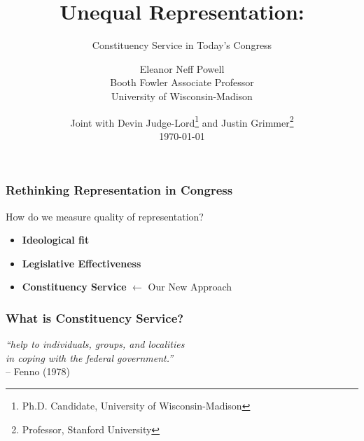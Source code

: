 \documentclass[13pt]{beamer}
\title{Unequal Representation:}
\subtitle{Constituency Service in Today's Congress}
\author[Judge-Lord, Grimmer, Powell]{Eleanor Neff Powell \\ Booth Fowler Associate Professor \\ University of Wisconsin-Madison}
\date[\today]{Joint with Devin Judge-Lord\thanks{Ph.D. Candidate, University of Wisconsin-Madison} and Justin Grimmer\thanks{Professor, Stanford University} \\ \bigskip \today}
\begin{document}
\begin{frame}
\maketitle
\end{frame}






\begin{frame} 
\frametitle{Rethinking Representation in Congress}
\Large
How do we measure quality of representation?

\begin{itemize}
\item \textbf{Ideological fit}
\item \textbf{Legislative Effectiveness}
\item \textbf{Constituency Service} \alert{$\leftarrow$ Our New Approach}
\end{itemize}
\end{frame}
\begin{frame}
\frametitle{What is Constituency Service?}
\begin{center}
\Large
\textit{``help to individuals, groups, and localities \\ in coping with the federal government.''}\\  -- Fenno (1978)
\end{center}
\end{frame}
\end{document}
